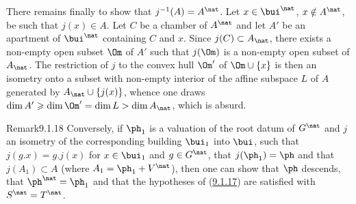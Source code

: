 \documentclass[12pt,a4paper,oneside,english]{smfart}
\makeatletter
\newcommand{\btanchor}[1]{\leavevmode\Hy@raisedlink{\hypertarget{bt:#1}{}}}
\newcommand{\btref}[1]{\hyperlink{bt:#1}{#1}}
\theoremstyle{definition}
\theoremstyle{bt}
\makeatother
\begin{document}
There remains finally to show that $j^{-1}(A)=A^\nat$. Let $x\in\bui^\nat$,
$x\notin A^\nat$, be such that $j(x)\in A$. Let $C$ be a chamber of $A^\nat$ and let
$A'$ be an apartment of $\bui^\nat$ containing $C$ and $x$. Since $j(C)\subset A_\nat$,
there exists a non-empty open subset $\Om$ of $A'$ such that $j(\Om)$ is a non-empty
open subset of $A_\nat$. The restriction of $j$ to the convex hull $\Om'$ of
$\Om\cup\{x\}$ is then an isometry onto a subset with non-empty interior of the affine
subspace $L$ of $A$ generated by $A_\nat\cup\{j(x)\}$, whence one draws
$\dim A'\geqslant\dim\Om'=\dim L>\dim A_\nat$, which is absurd.

\begin{stmtup}{Remark}{9.1.18}\btanchor{9.1.18}
Conversely, if $\ph_1$ is a valuation of the root datum of $G^\nat$ and $j$ an isometry
of the corresponding building $\bui_1$ into $\bui$, such that $j(g.x)=g.j(x)$ for
$x\in\bui_1$ and $g\in G^\nat$, that $j(\ph_1)=\ph$ and that $j(A_1)\subset A$ (where
$A_1=\ph_1+V^\nat$), then one can show that $\ph$ descends, that $\ph^\nat=\ph_1$ and
that the hypotheses of (\btref{9.1.17}) are satisfied with $S^\nat=T^\nat$.
\end{stmtup}
\end{document}
